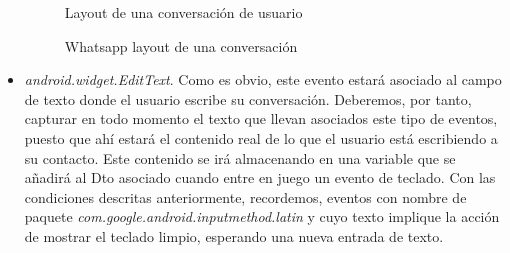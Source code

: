 \documentclass[12pt,a4paper,oneside]{book} %
\begin{document}
\begin{itemize}
\begin{figure}[H]
\begin{center}
	    	\caption{Whatsapp layout de una conversación}{Layout de una conversación de usuario}
    	\label{fig:Whatsapp Relative Layout}
	\end{center}
\end{figure}
\item \textit{android.widget.EditText}. Como es obvio, este evento estará asociado al campo de texto donde el usuario escribe su conversación. Deberemos, por tanto, capturar en todo momento el texto que llevan asociados este tipo de eventos, puesto que ahí estará el contenido real de lo que el usuario está escribiendo a su contacto. 
\newline \newline 
Este contenido se irá almacenando en una variable que se añadirá al Dto asociado cuando entre en juego un evento de teclado. Con las condiciones descritas anteriormente, recordemos, eventos con nombre de paquete \textit{com.google.android.inputmethod.latin} y cuyo texto implique la acción de mostrar el teclado limpio, esperando una nueva entrada de texto. 
\begin{figure}[H]
	\begin{center}

\end{center}
\end{figure}
\end{itemize}
\end{document}
